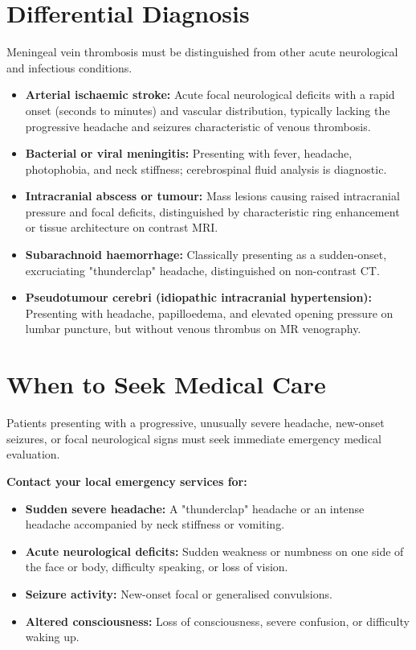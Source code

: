 \section*{Differential Diagnosis}
Meningeal vein thrombosis must be distinguished from other acute neurological and infectious conditions.
\begin{itemize}
    \item \textbf{Arterial ischaemic stroke:} Acute focal neurological deficits with a rapid onset (seconds to minutes) and vascular distribution, typically lacking the progressive headache and seizures characteristic of venous thrombosis.
    \item \textbf{Bacterial or viral meningitis:} Presenting with fever, headache, photophobia, and neck stiffness; cerebrospinal fluid analysis is diagnostic.
    \item \textbf{Intracranial abscess or tumour:} Mass lesions causing raised intracranial pressure and focal deficits, distinguished by characteristic ring enhancement or tissue architecture on contrast MRI.
    \item \textbf{Subarachnoid haemorrhage:} Classically presenting as a sudden-onset, excruciating "thunderclap" headache, distinguished on non-contrast CT.
    \item \textbf{Pseudotumour cerebri (idiopathic intracranial hypertension):} Presenting with headache, papilloedema, and elevated opening pressure on lumbar puncture, but without venous thrombus on MR venography.
\end{itemize}

\section*{When to Seek Medical Care}
Patients presenting with a progressive, unusually severe headache, new-onset seizures, or focal neurological signs must seek immediate emergency medical evaluation.

\textbf{Contact your local emergency services for:}
\begin{itemize}
    \item \textbf{Sudden severe headache:} A "thunderclap" headache or an intense headache accompanied by neck stiffness or vomiting.
    \item \textbf{Acute neurological deficits:} Sudden weakness or numbness on one side of the face or body, difficulty speaking, or loss of vision.
    \item \textbf{Seizure activity:} New-onset focal or generalised convulsions.
    \item \textbf{Altered consciousness:} Loss of consciousness, severe confusion, or difficulty waking up.
\end{itemize}

